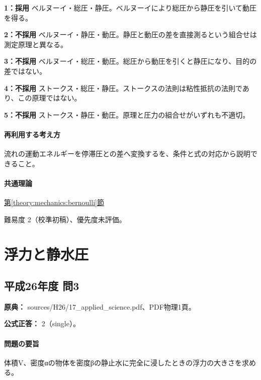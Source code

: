 \noindent\textbf{1：採用} ベルヌーイ・総圧・静圧。ベルヌーイにより総圧から静圧を引いて動圧を得る。\par

\noindent\textbf{2：不採用} ベルヌーイ・静圧・動圧。静圧と動圧の差を直接測るという組合せは測定原理と異なる。\par

\noindent\textbf{3：不採用} ベルヌーイ・総圧・動圧。総圧から動圧を引くと静圧になり、目的の差ではない。\par

\noindent\textbf{4：不採用} ストークス・総圧・静圧。ストークスの法則は粘性抵抗の法則であり、この原理ではない。\par

\noindent\textbf{5：不採用} ストークス・静圧・動圧。原理と圧力の組合せがいずれも不適切。\par

\paragraph{再利用する考え方} 流れの運動エネルギーを停滞圧との差へ変換するを、条件と式の対応から説明できること。

\paragraph{共通理論} \hyperref[theory:mechanics:bernoulli]{第\ref*{theory:mechanics:bernoulli}節}

\par 難易度 2（校準初稿）、優先度未評価。

\section{浮力と静水圧}

\subsection{平成26年度 問3}
\label{q:h26-reg-applied-03}

\noindent\textbf{原典：} sources/H26/17\_applied\_science.pdf、PDF物理1頁。

\textbf{公式正答：} 2（single）。

\paragraph{問題の要旨} 体積V、密度αの物体を密度βの静止水に完全に浸したときの浮力の大きさを求める。

